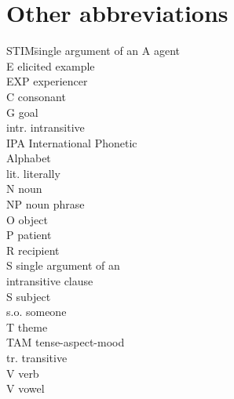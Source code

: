 \section*{Other abbreviations}
	\begin{multicols}{2}
		\begin{tabbing}
		  STIM\hspace{\tabcolsep}\= single argument of an\kill
			A 		\>	agent\\
			E	\>	elicited example\\
			EXP 	\>	experiencer\\
			C		\>  consonant\\
			G 		\>	goal\\
			intr. 	\>	intransitive\\
			IPA 	\>	International Phonetic\\
			{}		\>	Alphabet\\
			lit. 	\>	literally\\
			N 		\>	noun\\
			NP 		\>	noun phrase\\
			O		\>	object\\
			P 		\>	patient\\
			R 		\>	recipient\\
			S 		\>	single argument of an\\
			{}		\>	intransitive clause\\
			S		\>	subject\\
			s.o.		\>	someone\\
			T 		\>	theme\\
			TAM 	\>	tense-aspect-mood\\
			tr. 	\>	transitive\\
			V 		\>	verb\\
			V		\> 	vowel\\
		\end{tabbing}
	\end{multicols}
